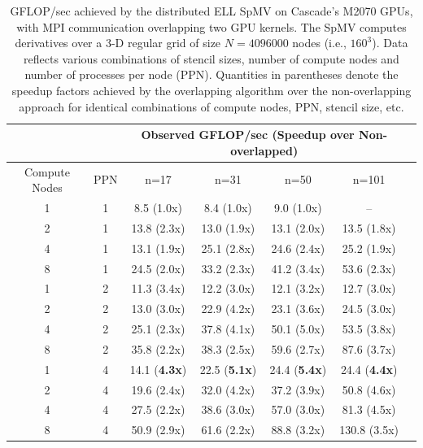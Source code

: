 \begin{table}[htb]
\centering
\caption{GFLOP/sec achieved by the distributed ELL SpMV on Cascade's M2070 GPUs, with MPI communication overlapping two GPU kernels. The SpMV computes derivatives over a 3-D regular grid of size $N=4096000$ nodes (i.e., $160^3$). Data reflects various combinations of stencil sizes, number of compute nodes and number of processes per node (PPN). Quantities in parentheses denote the speedup factors achieved by the overlapping algorithm over the non-overlapping approach for identical combinations of compute nodes, PPN, stencil size, etc. }
\label{tbl:cascade_m2070_overlap}
\begin{tabular}{c|c|c|c|c|c|c}
 \multicolumn{2}{c}{ } & \multicolumn{4}{|c|}{Observed GFLOP/sec (Speedup over Non-overlapped)} \\  \hline
Compute Nodes   &   PPN  &   n=17   &   n=31   &   n=50   &   n=101   \\ \hline
1   &   1   &   8.5 (1.0x)   &   8.4 (1.0x)   &   9.0 (1.0x)   &  --    \\
2   &   1   &   13.8 (2.3x)   &   13.0 (1.9x)   &   13.1 (2.0x)   &   13.5 (1.8x)   \\
4   &   1   &   13.1 (1.9x)   &   25.1 (2.8x)   &   24.6 (2.4x)   &   25.2 (1.9x)   \\
8   &   1   &   24.5 (2.0x)   &   33.2 (2.3x)   &   41.2 (3.4x)   &   53.6 (2.3x)   \\ \hline
1   &   2   &   11.3 (3.4x)   &   12.2 (3.0x)   &   12.1 (3.2x)   &   12.7 (3.0x)   \\
2   &   2   &   13.0 (3.0x)   &   22.9 (4.2x)   &   23.1 (3.6x)   &   24.5 (3.0x)   \\
4   &   2   &   25.1 (2.3x)   &   37.8 (4.1x)   &   50.1 (5.0x)   &   53.5 (3.8x)   \\
8   &   2   &   35.8 (2.2x)   &   38.3 (2.5x)   &   59.6 (2.7x)   &   87.6 (3.7x)   \\ \hline
1   &   4   &   14.1 (\textbf{4.3x})   &   22.5 (\textbf{5.1x})   &   24.4 (\textbf{5.4x})   &   24.4 (\textbf{4.4x})   \\
2   &   4   &   19.6 (2.4x)   &   32.0 (4.2x)   &   37.2 (3.9x)   &   50.8 (4.6x)   \\
4   &   4   &   27.5 (2.2x)   &   38.6 (3.0x)   &   57.0 (3.0x)   &   81.3 (4.5x)   \\
8   &   4   &   50.9 (2.9x)   &   61.6 (2.2x)   &   88.8 (3.2x)   &   130.8 (3.5x)  
\end{tabular} 
\end{table}


